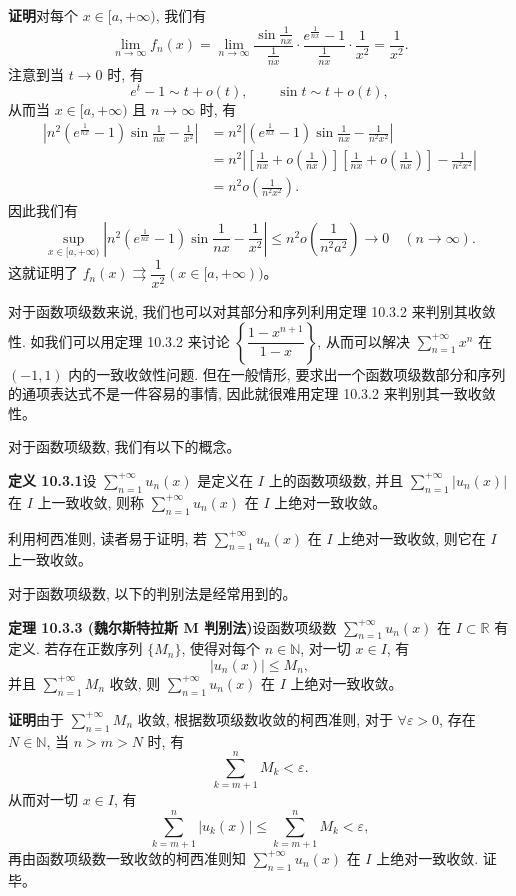 \documentclass[UTF8,12pt,a4paper,fontset=fandol]{ctexart}
\begin{document}
\noindent\textbf{证明}\quad 对每个 $x\in[a,+\infty)$, 我们有
\[
  \lim_{n\to\infty}f_n(x)
  =\lim_{n\to\infty}\frac{\sin\frac1{nx}}{\frac1{nx}}\cdot
  \frac{e^{\frac1{nx}}-1}{\frac1{nx}}\cdot\frac1{x^2}
  =\frac1{x^2}.
\]
注意到当 $t\to0$ 时, 有
\[
  e^t-1\sim t+o(t),\qquad \sin t\sim t+o(t),
\]
从而当 $x\in[a,+\infty)$ 且 $n\to\infty$ 时, 有
\[
\begin{aligned}
  \left|n^2\left(e^{\frac1{nx}}-1\right)\sin\frac1{nx}-\frac1{x^2}\right|
  &=n^2\left|\left(e^{\frac1{nx}}-1\right)\sin\frac1{nx}-\frac1{n^2x^2}\right|\\
  &=n^2\left|\left[\frac1{nx}+o\left(\frac1{nx}\right)\right]
  \left[\frac1{nx}+o\left(\frac1{nx}\right)\right]-\frac1{n^2x^2}\right|\\
  &=n^2o\left(\frac1{n^2x^2}\right).
\end{aligned}
\]
因此我们有
\[
  \sup_{x\in[a,+\infty)}
  \left|n^2\left(e^{\frac1{nx}}-1\right)\sin\frac1{nx}-\frac1{x^2}\right|
  \leq n^2o\left(\frac1{n^2a^2}\right)\to0\quad(n\to\infty).
\]
这就证明了 $f_n(x)\rightrightarrows\dfrac1{x^2}(x\in[a,+\infty))$。

对于函数项级数来说, 我们也可以对其部分和序列利用定理 10.3.2 来判别其收敛性. 如我们可以用定理 10.3.2 来讨论 $\left\{\dfrac{1-x^{n+1}}{1-x}\right\}$, 从而可以解决 $\sum\limits_{n=1}^{+\infty}x^n$ 在 $(-1,1)$ 内的一致收敛性问题. 但在一般情形, 要求出一个函数项级数部分和序列的通项表达式不是一件容易的事情, 因此就很难用定理 10.3.2 来判别其一致收敛性。

对于函数项级数, 我们有以下的概念。

\noindent\textbf{定义 10.3.1}\quad 设 $\sum\limits_{n=1}^{+\infty}u_n(x)$ 是定义在 $I$ 上的函数项级数, 并且 $\sum\limits_{n=1}^{+\infty}|u_n(x)|$ 在 $I$ 上一致收敛, 则称 $\sum\limits_{n=1}^{+\infty}u_n(x)$ 在 $I$ 上绝对一致收敛。

利用柯西准则, 读者易于证明, 若 $\sum\limits_{n=1}^{+\infty}u_n(x)$ 在 $I$ 上绝对一致收敛, 则它在 $I$ 上一致收敛。

对于函数项级数, 以下的判别法是经常用到的。

\noindent\textbf{定理 10.3.3 (魏尔斯特拉斯 M 判别法)}\quad 设函数项级数 $\sum\limits_{n=1}^{+\infty}u_n(x)$ 在 $I\subset\mathbb R$ 有定义. 若存在正数序列 $\{M_n\}$, 使得对每个 $n\in\mathbb N$, 对一切 $x\in I$, 有
\[
  |u_n(x)|\leq M_n,
\]
并且 $\sum\limits_{n=1}^{+\infty}M_n$ 收敛, 则 $\sum\limits_{n=1}^{+\infty}u_n(x)$ 在 $I$ 上绝对一致收敛。

\noindent\textbf{证明}\quad 由于 $\sum\limits_{n=1}^{+\infty}M_n$ 收敛, 根据数项级数收敛的柯西准则, 对于 $\forall\varepsilon>0$, 存在 $N\in\mathbb N$, 当 $n>m>N$ 时, 有
\[
  \sum_{k=m+1}^n M_k<\varepsilon.
\]
从而对一切 $x\in I$, 有
\[
  \sum_{k=m+1}^n |u_k(x)|\leq\sum_{k=m+1}^n M_k<\varepsilon,
\]
再由函数项级数一致收敛的柯西准则知 $\sum\limits_{n=1}^{+\infty}u_n(x)$ 在 $I$ 上绝对一致收敛. 证毕。
\end{document}

